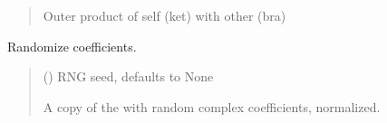 \documentclass[letterpaper,10pt,english]{sphinxmanual}
\begin{document}
\begin{fulllineitems}
\begin{fulllineitems}
\begin{quote}
\begin{description}
\sphinxAtStartPar
Outer product of self (ket) with other (bra)

\sphinxAtStartPar
{\hyperref[\detokenize{spinbox:spinbox.core.ProductOperator}]{}}

\end{description}\end{quote}

\end{fulllineitems}


\begin{fulllineitems}
\label{\detokenize{spinbox:spinbox.core.ProductState.randomize}}
\pysigstartsignatures
{}
\pysigstopsignatures
\sphinxAtStartPar
Randomize coefficients.
\begin{quote}\begin{description}
\sphinxAtStartPar
{} (\sphinxstyleliteralemphasis{\sphinxupquote{, }}) \textendash{} RNG seed, defaults to None

\sphinxAtStartPar
A copy of the  with random complex coefficients, normalized.

\sphinxAtStartPar
{\hyperref[\detokenize{spinbox:spinbox.core.ProductState}]{}}

\end{description}\end{quote}

\end{fulllineitems}



\end{fulllineitems}
\end{document}
